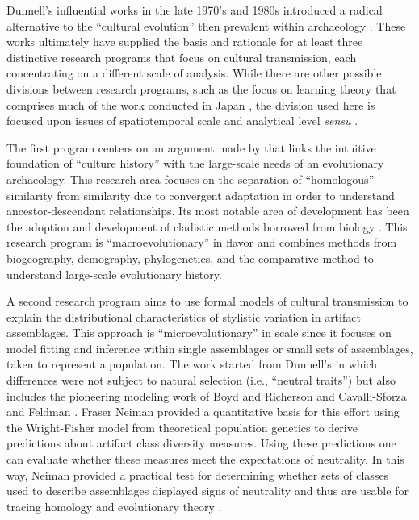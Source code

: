 Dunnell's influential works in the late 1970's and 1980s introduced a radical alternative to the ``cultural evolution'' then prevalent within archaeology \citep{Dunnell1978,dunnell1982harvey,Dunnell1980,Dunnell1989}.  These works ultimately have supplied the basis and rationale for at least three distinctive research programs that focus on cultural transmission, each concentrating on a different scale of analysis.  While there are other possible divisions between research programs, such as the focus on learning theory that comprises much of the work conducted in Japan , the division used here is focused upon issues of spatiotemporal scale and analytical level \emph{sensu} \citet{Dunnell1971}.  

The first program centers on an argument made by \citet{Dunnell1978} that links the intuitive foundation of ``culture history'' with the large-scale needs of an evolutionary archaeology.  This research area focuses on the separation of ``homologous'' similarity from similarity due to convergent adaptation in order to understand ancestor-descendant relationships.  Its most notable area of development has been the adoption and development of cladistic methods borrowed from biology \citep{borgerhoff2006cultural,lyman1997rise,Lyman2006a,o1999seriation,o2000time,o2001cladistics,o2003cladistics,o2003resolving,OBrian2000,prentiss2019cultural,PRENTISS201564,Temkin2007}.  This research program is ``macroevolutionary'' in flavor and combines methods from biogeography, demography, phylogenetics, and the comparative method to understand large-scale evolutionary history.  

A second research program aims to use formal models of cultural transmission to explain the distributional characteristics of stylistic variation in artifact assemblages.  This approach is ``microevolutionary'' in scale since it focuses on model fitting and inference within single assemblages or small sets of assemblages, taken to represent a population.  The work started from Dunnell's \citeyearpar{Dunnell1978} in which differences were not subject to natural selection (i.e., ``neutral traits'') but also includes the pioneering modeling work of Boyd and Richerson \citeyearpar{BR1985} and Cavalli-Sforza and Feldman \citeyearpar{CF1981}.  Fraser Neiman \citeyearpar{Neiman1995} provided a quantitative basis for this effort using the Wright-Fisher model from theoretical population genetics to derive predictions about artifact class diversity measures. Using these predictions one can evaluate whether these measures meet the expectations of neutrality.  In  this way, Neiman provided a practical test for determining whether sets of classes used to describe assemblages displayed signs of neutrality and thus are usable for tracing homology and evolutionary theory \citep{eerkens2006cultural,Eerkens2007,Lipo1997,Lipo2001neutrality,Lipo2006}.  

